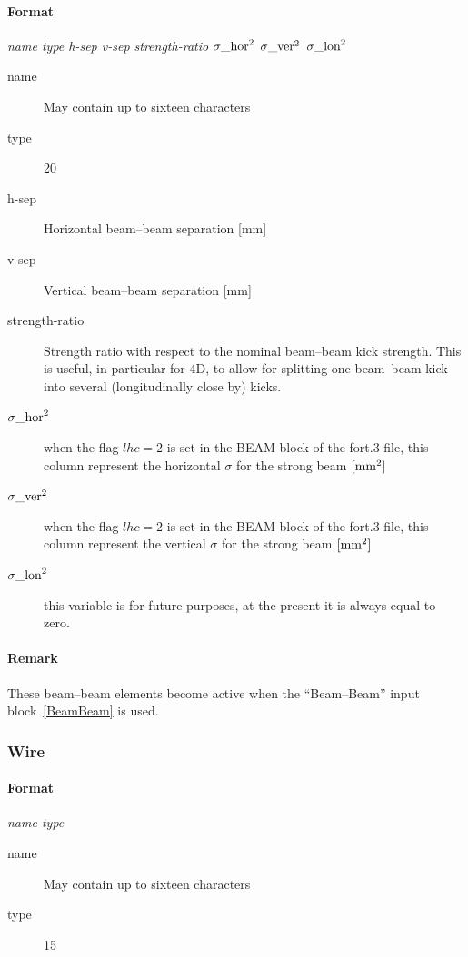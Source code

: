 \documentclass[a4paper,11pt]{report}
\begin{document}
\paragraph{Format} {\em name type h-sep v-sep strength-ratio ${\sigma\_\rm{hor}}^2$ ${\sigma\_\rm{ver}}^2$ ${\sigma\_\rm{lon}}^2$}
\begin{description}
\item [name] May contain up to sixteen characters
\item [type] 20
\item [h-sep] Horizontal beam--beam separation [mm]
\item [v-sep] Vertical beam--beam separation [mm]
\item [strength-ratio] Strength ratio with respect to the nominal
  beam--beam kick strength. This is useful, in particular for 4D, to
  allow for splitting one beam--beam kick into several (longitudinally
  close by) kicks.
\item [${\sigma\_\rm{hor}}^2$] when the flag $lhc=2$ is set in the BEAM block of the fort.3 file, this column represent the horizontal $\sigma$ for the strong beam $\rm{[mm^2]}$
\item [${\sigma\_\rm{ver}}^2$] when the flag $lhc=2$ is set in the BEAM block of the fort.3 file, this column represent the vertical $\sigma$ for the strong beam $\rm{[mm^2]}$
\item [${\sigma\_\rm{lon}}^2$] this variable is for future purposes, at the present it is always equal to zero.
\end{description}

\paragraph{Remark}
These beam--beam elements become active when the ``Beam--Beam'' input block~\ref{BeamBeam} is used.

\subsubsection{Wire} \label{WIRE}
\paragraph{Format} {\em name type}
\begin{description}
	\item [name] May contain up to sixteen characters
	\item [type] 15
\end{description}
\end{document}
